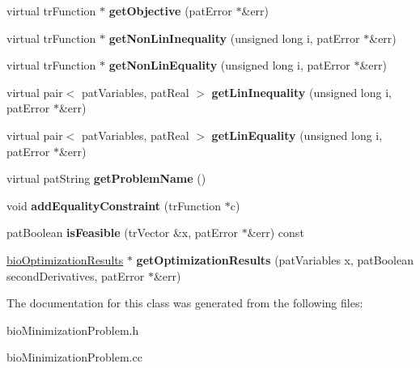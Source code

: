 \begin{DoxyCompactItemize}
virtual tr\+Function $\ast$ {\bfseries get\+Objective} (pat\+Error $\ast$\&err)
\item 
\mbox{\label{classbio_minimization_problem_a43357124d22290ab1d44b9ed460b3226}} 
virtual tr\+Function $\ast$ {\bfseries get\+Non\+Lin\+Inequality} (unsigned long i, pat\+Error $\ast$\&err)
\item 
\mbox{\label{classbio_minimization_problem_af13fbe803e7eb7892db408697295b3e6}} 
virtual tr\+Function $\ast$ {\bfseries get\+Non\+Lin\+Equality} (unsigned long i, pat\+Error $\ast$\&err)
\item 
\mbox{\label{classbio_minimization_problem_a45b5fbb3f4999ce659acf0fbedb8bcdc}} 
virtual pair$<$ pat\+Variables, pat\+Real $>$ {\bfseries get\+Lin\+Inequality} (unsigned long i, pat\+Error $\ast$\&err)
\item 
\mbox{\label{classbio_minimization_problem_aaf01255c906e51d37f7acb8ca29894f2}} 
virtual pair$<$ pat\+Variables, pat\+Real $>$ {\bfseries get\+Lin\+Equality} (unsigned long i, pat\+Error $\ast$\&err)
\item 
\mbox{\label{classbio_minimization_problem_a23af14aa180283fa7b89b1d96b6dfef4}} 
virtual pat\+String {\bfseries get\+Problem\+Name} ()
\item 
\mbox{\label{classbio_minimization_problem_a3a8a060022b61a311da6a9867c4ef908}} 
void {\bfseries add\+Equality\+Constraint} (tr\+Function $\ast$c)
\item 
\mbox{\label{classbio_minimization_problem_ab3b9e55bb792c66fb7325020d7fb0df8}} 
pat\+Boolean {\bfseries is\+Feasible} (tr\+Vector \&x, pat\+Error $\ast$\&err) const
\item 
\mbox{\label{classbio_minimization_problem_aea682709a9b4ec2d7d419eba160a50a0}} 
\hyperlink{classbio_optimization_results}{bio\+Optimization\+Results} $\ast$ {\bfseries get\+Optimization\+Results} (pat\+Variables x, pat\+Boolean second\+Derivatives, pat\+Error $\ast$\&err)
\end{DoxyCompactItemize}


The documentation for this class was generated from the following files\+:\begin{DoxyCompactItemize}
\item 
bio\+Minimization\+Problem.\+h\item 
bio\+Minimization\+Problem.\+cc\end{DoxyCompactItemize}
